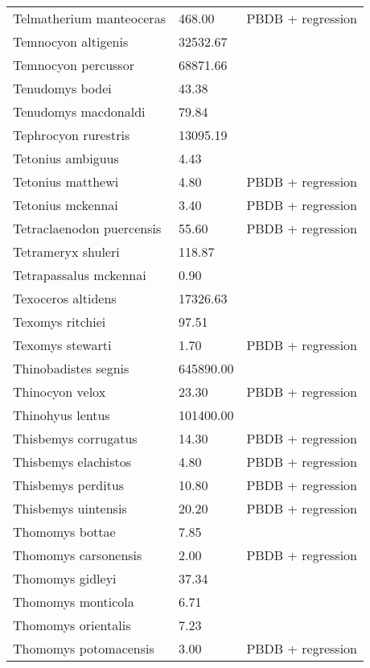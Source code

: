 \begin{longtable}{p{} p{} p{}}
    Telmatherium manteoceras & 468.00 & PBDB + regression \\ 
    Temnocyon altigenis & 32532.67 & \cite{Tomiya2013} \\ 
    Temnocyon percussor & 68871.66 & \cite{Tomiya2013} \\ 
    Tenudomys bodei & 43.38 & \cite{Tomiya2013} \\ 
    Tenudomys macdonaldi & 79.84 & \cite{Tomiya2013} \\ 
    Tephrocyon rurestris & 13095.19 & \cite{Tomiya2013} \\ 
    Tetonius ambiguus & 4.43 & \cite{Brown1980} \\ 
    Tetonius matthewi & 4.80 & PBDB + regression \\ 
    Tetonius mckennai & 3.40 & PBDB + regression \\ 
    Tetraclaenodon puercensis & 55.60 & PBDB + regression \\ 
    Tetrameryx shuleri & 118.87 & \cite{Smith2004} \\ 
    Tetrapassalus mckennai & 0.90 & \cite{Brown1980} \\ 
    Texoceros altidens & 17326.63 & \cite{Tomiya2013} \\ 
    Texomys ritchiei & 97.51 & \cite{Tomiya2013} \\ 
    Texomys stewarti & 1.70 & PBDB + regression \\ 
    Thinobadistes segnis & 645890.00 & \cite{McDonald1995} \\ 
    Thinocyon velox & 23.30 & PBDB + regression \\ 
    Thinohyus lentus & 101400.00 & \cite{McKenna2011} \\ 
    Thisbemys corrugatus & 14.30 & PBDB + regression \\ 
    Thisbemys elachistos & 4.80 & PBDB + regression \\ 
    Thisbemys perditus & 10.80 & PBDB + regression \\ 
    Thisbemys uintensis & 20.20 & PBDB + regression \\ 
    Thomomys bottae & 7.85 & \cite{Smith2004} \\ 
    Thomomys carsonensis & 2.00 & PBDB + regression \\ 
    Thomomys gidleyi & 37.34 & \cite{Tomiya2013} \\ 
    Thomomys monticola & 6.71 & \cite{Smith2004} \\ 
    Thomomys orientalis & 7.23 & \cite{Smith2004} \\ 
    Thomomys potomacensis & 3.00 & PBDB + regression \\ 

\end{longtable}
